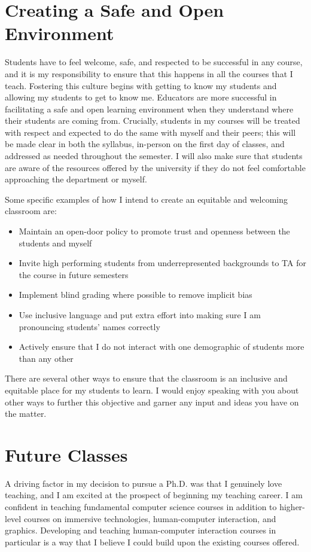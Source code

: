 \section*{Creating a Safe and Open Environment}
\vspace{-0.25cm}
Students have to feel welcome, safe, and respected to be successful in any course, and it is my responsibility to ensure that this happens in all the courses that I teach. Fostering this culture begins with getting to know my students and allowing my students to get to know me. Educators are more successful in facilitating a safe and open learning environment when they understand where their students are coming from. Crucially, students in my courses will be treated with respect and expected to do the same with myself and their peers; this will be made clear in both the syllabus, in-person on the first day of classes, and addressed as needed throughout the semester. I will also make sure that students are aware of the resources offered by the university if they do not feel comfortable approaching the department or myself.

Some specific examples of how I intend to create an equitable and welcoming classroom are: 
\begin{itemize}
    \item Maintain an open-door policy to promote trust and openness between the students and myself
    \item Invite high performing students from underrepresented backgrounds to TA for the course in future semesters
    \item Implement blind grading where possible to remove implicit bias
    \item Use inclusive language and put extra effort into making sure I am pronouncing students' names correctly
    \item Actively ensure that I do not interact with one demographic of students more than any other
\end{itemize}

There are several other ways to ensure that the classroom is an inclusive and equitable place for my students to learn. I would enjoy speaking with you about other ways to further this objective and garner any input and ideas you have on the matter.

\section*{Future Classes}
\vspace{-0.25cm}
A driving factor in my decision to pursue a Ph.D. was that I genuinely love teaching, and I am excited at the prospect of beginning my teaching career. I am confident in teaching fundamental computer science courses in addition to higher-level courses on immersive technologies, human-computer interaction, and graphics. Developing and teaching human-computer interaction courses in particular is a way that I believe I could build upon the existing courses offered.

